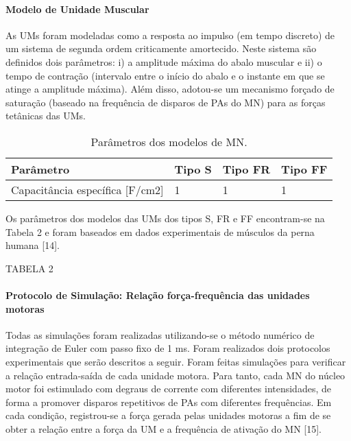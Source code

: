 \paragraph{Modelo de Unidade Muscular}
As UMs foram modeladas como a resposta ao impulso (em tempo discreto) de um sistema de segunda ordem criticamente amortecido. Neste sistema são definidos dois parâmetros: i) a amplitude máxima do abalo muscular e ii) o tempo de contração (intervalo entre o início do abalo e o instante em que se atinge a amplitude máxima). Além disso, adotou-se um mecanismo forçado de saturação (baseado na frequência de disparos de PAs do MN) para as forças tetânicas das UMs.

\begin{table}
 \caption{Parâmetros dos modelos de MN.}
  \centering
  \begin{tabular}{llll}
    \toprule
    Parâmetro     & Tipo S     & Tipo FR     & Tipo FF   \\
    \midrule
    Capacitância específica [F/cm2] & 1 & 1 & 1    \\
    \bottomrule
  \end{tabular}
  \label{tab:table}
\end{table}


Os parâmetros dos modelos das UMs dos tipos S, FR e FF encontram-se na Tabela 2 e foram baseados em dados experimentais de músculos da perna humana [14].

TABELA 2

\paragraph{Protocolo de Simulação: Relação força-frequência das unidades motoras}
Todas as simulações foram realizadas utilizando-se o método numérico de integração de Euler com passo fixo de 1 ms. Foram realizados dois protocolos experimentais que serão descritos a seguir. Foram feitas simulações para verificar a relação entrada-saída de cada unidade motora. Para tanto, cada MN do núcleo motor foi estimulado com degraus de corrente com diferentes intensidades, de forma a promover disparos repetitivos de PAs com diferentes frequências. Em cada condição, registrou-se a força gerada pelas unidades motoras a fim de se obter a relação entre a força da UM e a frequência de ativação do MN [15].

